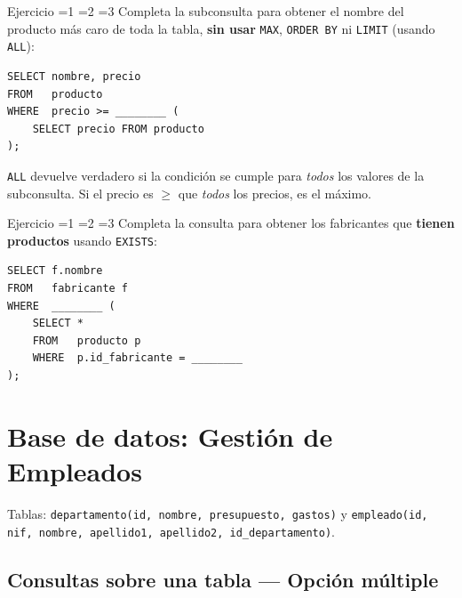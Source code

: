 \documentclass[12pt, a4paper]{article}
\newcommand{\estrella}{{\color{Goldenrod}\faStarSolid}}
\newcommand{\estrellavacia}{{\color{gray!45}\faStarSolid}}
\newcommand{\nivel}[1]{%
  \ifnum#1=1\estrella\estrellavacia\estrellavacia\fi
  \ifnum#1=2\estrella\estrella\estrellavacia\fi
  \ifnum#1=3\estrella\estrella\estrella\fi
}
\newcounter{numej}
\newcommand{\ej}{\stepcounter{numej}\thenumej}
\begin{document}
\begin{ejercicio}{Ejercicio \ej}{\nivel{3}}
Completa la subconsulta para obtener el nombre del producto más caro
de toda la tabla, \textbf{sin usar} \texttt{MAX}, \texttt{ORDER BY}
ni \texttt{LIMIT} (usando \texttt{ALL}):

\begin{lstlisting}
SELECT nombre, precio
FROM   producto
WHERE  precio >= ________ (
    SELECT precio FROM producto
);
\end{lstlisting}

\begin{hint}
\texttt{ALL} devuelve verdadero si la condición se cumple para
\emph{todos} los valores de la subconsulta.
Si el precio es $\geq$ que \emph{todos} los precios, es el máximo.
\end{hint}
\end{ejercicio}

\begin{ejercicio}{Ejercicio \ej}{\nivel{3}}
Completa la consulta para obtener los fabricantes que \textbf{tienen
productos} usando \texttt{EXISTS}:

\begin{lstlisting}
SELECT f.nombre
FROM   fabricante f
WHERE  ________ (
    SELECT *
    FROM   producto p
    WHERE  p.id_fabricante = ________
);
\end{lstlisting}
\end{ejercicio}

\section{Base de datos: Gestión de Empleados}

\begin{nota}
Tablas: \texttt{departamento(id, nombre, presupuesto, gastos)} y
\texttt{empleado(id, nif, nombre, apellido1, apellido2, id\_departamento)}.
\end{nota}

\subsection{Consultas sobre una tabla — Opción múltiple}
\end{document}
